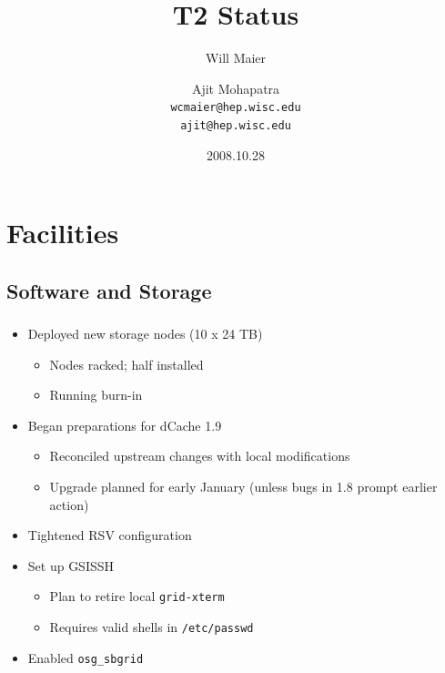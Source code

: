 \documentclass{beamer}
\title{T2 Status}
\author[Maier, Mohapatra]{
    Will Maier \and Ajit Mohapatra\\ 
    {\tt wcmaier@hep.wisc.edu}\\
    {\tt ajit@hep.wisc.edu}}
\institute[Wisconsin]{University of Wisconsin - High Energy Physics}
\date{2008.10.28}
\begin{document}
\begin{frame}
    \titlepage
\end{frame}


\section{Facilities}
\subsection{Software and Storage}
\begin{frame}
\frametitle{}
\begin{itemize}
    \item Deployed new storage nodes (10 x 24 TB)
    \begin{itemize}
        \item Nodes racked; half installed
        \item Running burn-in
    \end{itemize}
    \item Began preparations for dCache 1.9
    \begin{itemize}
        \item Reconciled upstream changes with local modifications
        \item Upgrade planned for early January (unless bugs in 1.8 prompt earlier action)
    \end{itemize}
    \item Tightened RSV configuration
    \item Set up GSISSH
    \begin{itemize}
        \item Plan to retire local {\tt grid-xterm}
        \item Requires valid shells in {\tt /etc/passwd}
    \end{itemize}
    \item Enabled {\tt osg\_sbgrid}
\end{itemize}
\end{frame}
\end{document}
